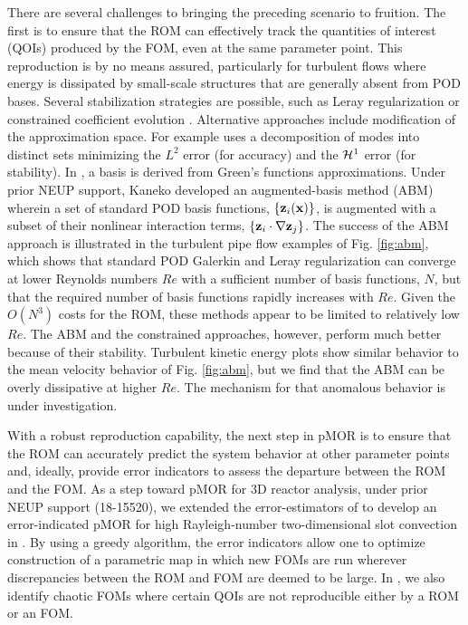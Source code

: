 There are several challenges to bringing the preceding scenario to fruition.
The first is to ensure that the ROM can effectively track the quantities
of interest (QOIs) produced by the FOM, even at the same parameter point.
This reproduction is by no means assured, particularly for turbulent flows
where energy is dissipated by small-scale structures that are generally absent
from POD bases.  Several stabilization strategies are possible, such as Leray
regularization \cite{wang2012proper} or constrained coefficient evolution
\cite{fick18}.  Alternative approaches include modification of the approximation
space.  For example \cite{akkari19} uses a decomposition of modes 
into distinct sets minimizing the $L^2$ error (for accuracy) and the ${\cal H}^1$
error (for stability).  In \cite{khodkar2019}, a basis is derived from Green's
functions approximations.
   Under prior NEUP support, Kaneko \cite{kaneko22a,kaneko22} developed an
augmented-basis method (ABM) wherein a set of standard POD basis functions,
$\{{\bf z}_i({\bf x}) \}$,  is augmented with a subset of their nonlinear interaction
terms, $\{{\bf z}_i \cdot \nabla {\bf z}_j\}$.   
  The success of the ABM approach is illustrated in the turbulent pipe flow
examples of Fig. \ref{fig:abm}, which shows that standard POD Galerkin and
Leray regularization can converge at lower Reynolds numbers $Re$ with a
sufficient number of basis functions, $N$, but that the required number of
basis functions rapidly increases with $Re$.  Given the $O(N^3)$ costs for the
ROM, these methods appear to be limited to relatively low $Re$.  The ABM and
the constrained approaches, however, perform much better because of their
stability.    Turbulent kinetic energy plots show similar behavior to the
mean velocity behavior of Fig. \ref{fig:abm}, but we find that the ABM
can be overly dissipative at higher $Re$.  The mechanism for that anomalous
behavior is under investigation.

With a robust reproduction capability, the next step in pMOR is to ensure that
the ROM can accurately predict the system behavior at other parameter points
and, ideally, provide error indicators to assess the departure between the ROM
and the FOM.  As a step toward pMOR for 3D reactor analysis, under prior NEUP
support (18-15520),  we extended the error-estimators of \cite{fick18} to develop
an error-indicated pMOR for high Rayleigh-number two-dimensional slot
convection in \cite{tsai22a}. 
By using a greedy algorithm, the error indicators allow one to optimize
construction of a parametric map in which new FOMs are run wherever
discrepancies between the ROM and FOM are deemed to be large.
In \cite{tsai22a}, we also identify chaotic FOMs where certain QOIs are not
reproducible either by a ROM or an FOM.


